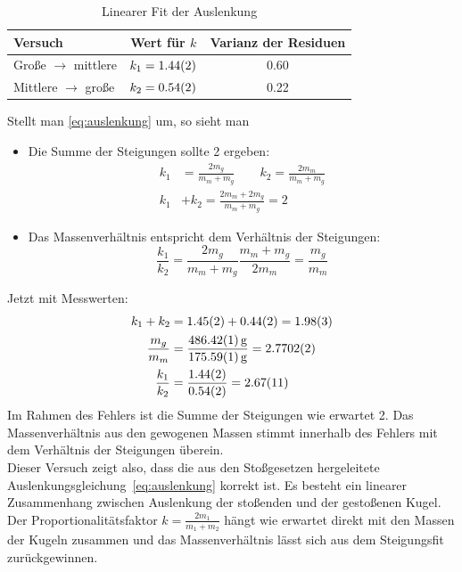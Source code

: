 \begin{table}[H]
  \centering
  \begin{tabular}{l | c | c}
    Versuch & Wert für $k$ & Varianz der Residuen \\ \hline
    Große $\rightarrow$ mittlere & $k_1=\num{1.44\pm0.02}$ & \num{0.60} \\
    Mittlere $\rightarrow$ große & $k_2=\num{.54\pm0.02}$ & \num{.22}
  \end{tabular}
  \caption{Linearer Fit der Auslenkung}
  \label{tab:pendelstossfit}
\end{table}
Stellt man \cref{eq:auslenkung} um, so sieht man 
\begin{itemize}
  \item Die Summe der Steigungen sollte 2 ergeben:
    \begin{align}
      k_1&=\frac{2m_g}{m_m+m_g} \qquad k_2=\frac{2m_m}{m_m+m_g} \\
      k_1&+k_2=\frac{2m_m+2m_g}{m_m+m_g}=2
      \label{eq:steigungssumme}
    \end{align}
  \item Das Massenverhältnis entspricht dem Verhältnis der Steigungen:
    \begin{equation}
      \frac{k_1}{k_2}=\frac{2m_g}{m_m+m_g}\frac{m_m+m_g}{2m_m}=\frac{m_g}{m_m}
      \label{eq:massenverhaeltnis}
    \end{equation}
\end{itemize}
Jetzt mit Messwerten:
\begin{align}
  k_1+k_2&=\num{1.45\pm0.02}+\num{0.44\pm0.02}=\num{1.98\pm0.03} \\
  \frac{m_g}{m_m}&=\frac{\SI{486.42\pm.01}{g}}{\SI{175.59\pm.01}{g}}=\num{2.7702\pm0.0002} \\
  \frac{k_1}{k_2}&=\frac{\num{1.44\pm0.02}}{\num{0.54\pm0.02}}=\num{2.67\pm0.11}
  \label{eq:steigungsauswertung}
\end{align}
Im Rahmen des Fehlers ist die Summe der Steigungen wie erwartet 2. Das Massenverhältnis aus den gewogenen Massen stimmt innerhalb des Fehlers mit dem Verhältnis der Steigungen überein.\\

Dieser Versuch zeigt also, dass die aus den Stoßgesetzen hergeleitete Auslenkungsgleichung~\cref{eq:auslenkung} korrekt ist. Es besteht ein linearer Zusammenhang zwischen Auslenkung der stoßenden und der gestoßenen Kugel. Der Proportionalitätsfaktor $k=\frac{2m_1}{m_1+m_2}$ hängt wie erwartet direkt mit den Massen der Kugeln zusammen und das Massenverhältnis lässt sich aus dem Steigungsfit zurückgewinnen.

